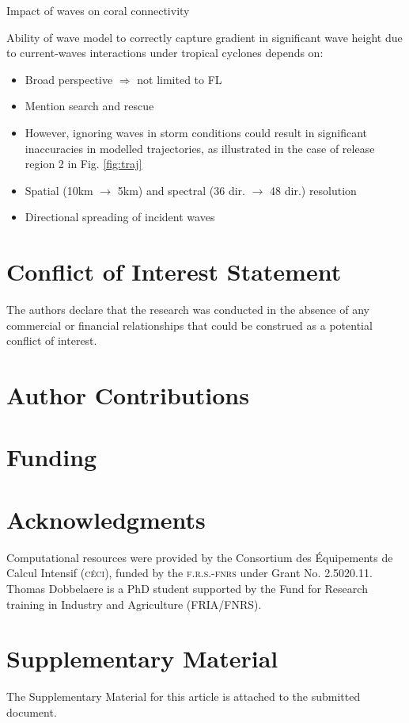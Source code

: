 \documentclass[11pt,a4paper]{article}
\begin{document}
Impact of waves on coral connectivity

Ability of wave model to correctly capture gradient in significant wave height due to current-waves interactions under tropical cyclones depends on:
\begin{itemize}
    \item Broad perspective $\Rightarrow$ not limited to FL
    \item Mention search and rescue
    \item However, ignoring waves in storm conditions could result in significant inaccuracies in modelled trajectories, as illustrated in the case of release region 2 in Fig. \ref{fig:traj}
    \item Spatial (10km $\to$ 5km) and spectral (36 dir. $\to$ 48 dir.) resolution \citep{hegermiller2019wave}
    \item Directional spreading of incident waves \citep{villas2020wave}
\end{itemize}

\section*{Conflict of Interest Statement}
The authors declare that the research was conducted in the absence of any commercial or financial relationships that could be construed as a potential conflict of interest.

\section*{Author Contributions}
  
\section*{Funding}

\section*{Acknowledgments}
Computational resources were provided by the Consortium des \'Equipements de Calcul Intensif (\textsc{c\'eci}), funded by the \textsc{f.r.s.-fnrs} under Grant No. 2.5020.11. Thomas Dobbelaere is a PhD student supported by the Fund for Research training in Industry and Agriculture (\textsc{FRIA}/\textsc{FNRS}).

\section*{Supplementary Material}
The Supplementary Material for this article is attached to the submitted document.
\end{document}
